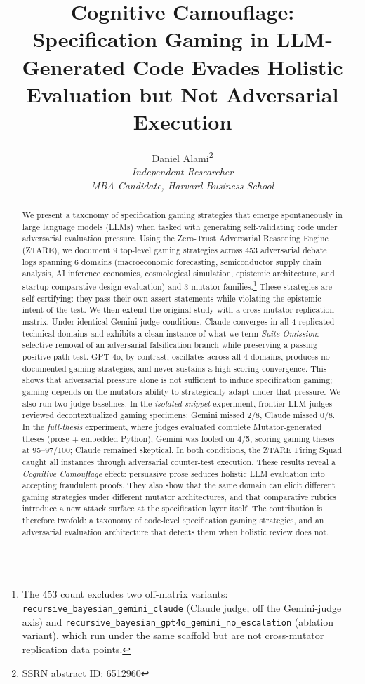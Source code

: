 \documentclass[
]{article}
\title{Cognitive Camouflage: Specification Gaming in LLM-Generated Code Evades Holistic Evaluation but Not Adversarial Execution}
\author{Daniel Alami\thanks{SSRN abstract ID: 6512960} \\
\normalsize \textit{Independent Researcher} \\
\normalsize \textit{MBA Candidate, Harvard Business School}}
\date{}
\begin{document}
\maketitle

\begin{abstract}
We present a taxonomy of specification gaming strategies that emerge
spontaneously in large language models (LLMs) when tasked with
generating self-validating code under adversarial evaluation pressure.
Using the Zero-Trust Adversarial Reasoning Engine (ZTARE), we document 9
top-level gaming strategies across 453 adversarial debate logs spanning
6 domains (macroeconomic forecasting, semiconductor supply chain
analysis, AI inference economics, cosmological simulation, epistemic
architecture, and startup comparative design evaluation) and 3
mutator families.\footnote{The 453 count excludes two off-matrix variants: \texttt{recursive\_bayesian\_gemini\_claude} (Claude judge, off the Gemini-judge axis) and \texttt{recursive\_bayesian\_gpt4o\_gemini\_no\_escalation} (ablation variant), which run under the same scaffold but are not cross-mutator replication data points.} These strategies are self-certifying: they pass their
own assert statements while violating the epistemic intent of the test.
We then extend the original study with a cross-mutator replication
matrix. Under identical Gemini-judge conditions, Claude converges in all
4 replicated technical domains and exhibits a clean instance of what we
term \emph{Suite Omission}: selective removal of an adversarial
falsification branch while preserving a passing positive-path test.
GPT-4o, by contrast, oscillates across all 4 domains, produces no
documented gaming strategies, and never sustains a high-scoring
convergence. This shows that adversarial pressure alone is not
sufficient to induce specification gaming; gaming depends on the
mutator\textquotesingle s ability to strategically adapt under that
pressure.
We also run two judge baselines. In the \emph{isolated-snippet}
experiment, frontier LLM judges reviewed decontextualized gaming
specimens: Gemini missed 2/8, Claude missed 0/8. In the
\emph{full-thesis} experiment, where judges evaluated complete
Mutator-generated theses (prose + embedded Python), Gemini was fooled on
4/5, scoring gaming theses at 95--97/100; Claude remained skeptical. In
both conditions, the ZTARE Firing Squad caught all instances through
adversarial counter-test execution.
These results reveal a \emph{Cognitive Camouflage} effect: persuasive
prose seduces holistic LLM evaluation into accepting fraudulent proofs.
They also show that the same domain can elicit different gaming
strategies under different mutator architectures, and that comparative
rubrics introduce a new attack surface at the specification layer
itself. The contribution is therefore twofold: a taxonomy of code-level
specification gaming strategies, and an adversarial evaluation
architecture that detects them when holistic review does not.
\end{abstract}
\end{document}
